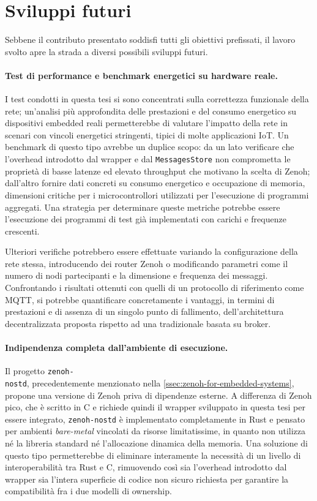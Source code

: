 \section{Sviluppi futuri}
\label{sec:future-work}

Sebbene il contributo presentato soddisfi tutti gli obiettivi prefissati, il
lavoro svolto apre la strada a diversi possibili sviluppi futuri.

\paragraph{Test di performance e benchmark energetici su hardware reale.}
I test condotti in questa tesi si sono concentrati sulla
correttezza funzionale della rete; un'analisi più approfondita delle
prestazioni e del consumo energetico su dispositivi embedded reali
permetterebbe di valutare l'impatto della rete in scenari con vincoli
energetici stringenti, tipici di molte applicazioni \ac{IoT}.
Un benchmark di questo tipo avrebbe un duplice scopo: da un lato verificare
che l'overhead introdotto dal wrapper e dal \texttt{MessagesStore} non
comprometta le proprietà di basse latenze ed elevato throughput che motivano
la scelta di Zenoh; dall'altro fornire dati concreti su consumo energetico
e occupazione di memoria, dimensioni critiche per i microcontrollori utilizzati
per l'esecuzione di programmi aggregati.
Una strategia per determinare queste metriche potrebbe essere l'esecuzione
dei programmi di test già implementati con carichi e frequenze crescenti.

Ulteriori verifiche potrebbero essere effettuate variando la configurazione della
rete stessa, introducendo dei router Zenoh o modificando parametri come il numero
di nodi partecipanti e la dimensione e frequenza dei messaggi.
Confrontando i risultati ottenuti con quelli di un protocollo di riferimento come
\ac{MQTT}, si potrebbe quantificare concretamente i vantaggi, in termini di
prestazioni e di assenza di un singolo punto di fallimento, dell'architettura
decentralizzata proposta rispetto ad una tradizionale basata su broker.

\paragraph{Indipendenza completa dall'ambiente di esecuzione.}
Il progetto \texttt{zenoh-\\nostd}, precedentemente menzionato nella \cref{ssec:zenoh-for-embedded-systems},
propone una versione di Zenoh priva di dipendenze esterne.
A differenza di Zenoh pico, che è scritto in C e richiede quindi il
wrapper sviluppato in questa tesi per essere integrato, \texttt{zenoh-nostd}
è implementato completamente in Rust e pensato per ambienti \emph{bare-metal}
vincolati da risorse limitatissime, in quanto non utilizza né la libreria
standard né l'allocazione dinamica della memoria.
Una soluzione di questo tipo permetterebbe di eliminare interamente la necessità
di un livello di interoperabilità tra Rust e C, rimuovendo così sia l'overhead
introdotto dal wrapper sia l'intera superficie di codice non sicuro richiesta
per garantire la compatibilità fra i due modelli di ownership.

